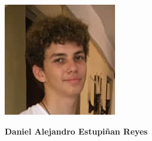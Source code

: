 \begin{minipage}{0.2\textwidth}
	\includegraphics[width=\linewidth]{img/concursantes/daniel.png} %
\end{minipage}
\hfill
\begin{minipage}{0.7\textwidth}
	\textbf{Daniel Alejandro Estupiñan Reyes}
	
\end{minipage}


